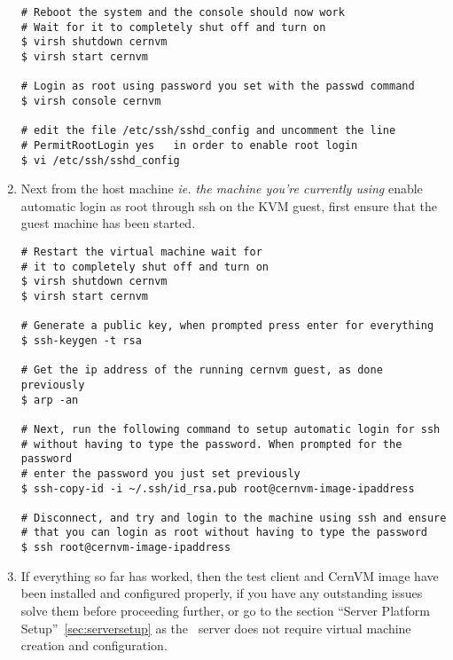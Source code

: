 \begin{enumerate}
\lstset{caption= Enable SSH Root Login}
\begin{lstlisting}
# Reboot the system and the console should now work
# Wait for it to completely shut off and turn on
$ virsh shutdown cernvm
$ virsh start cernvm

# Login as root using password you set with the passwd command
$ virsh console cernvm

# edit the file /etc/ssh/sshd_config and uncomment the line 
# PermitRootLogin yes	in order to enable root login
$ vi /etc/ssh/sshd_config

\end{lstlisting}

\item 	Next from the host machine \emph{ie. the machine you're currently using} enable automatic login as root 
		through ssh on the KVM guest, first ensure that the guest machine has been started.
		
\lstset{caption= Enable Automatic SSH Root Login}
\begin{lstlisting}
# Restart the virtual machine wait for 
# it to completely shut off and turn on
$ virsh shutdown cernvm
$ virsh start cernvm

# Generate a public key, when prompted press enter for everything
$ ssh-keygen -t rsa

# Get the ip address of the running cernvm guest, as done previously
$ arp -an

# Next, run the following command to setup automatic login for ssh
# without having to type the password. When prompted for the password
# enter the password you just set previously
$ ssh-copy-id -i ~/.ssh/id_rsa.pub root@cernvm-image-ipaddress
		
# Disconnect, and try and login to the machine using ssh and ensure 
# that you can login as root without having to type the password
$ ssh root@cernvm-image-ipaddress
\end{lstlisting}

\item	If everything so far has worked, then the test client and CernVM image have been installed and configured properly,
		if you have any outstanding issues solve them before proceeding further, or go to the section ``Server Platform 		
		Setup''~\ref{sec:serversetup} as the \tapper~server does not require virtual machine creation and configuration.
\end{enumerate}

